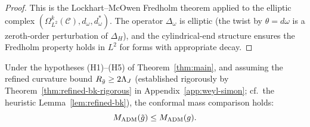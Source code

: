 \begin{proof}
This is the Lockhart--McOwen \cite{lockhartmccowen1985} Fredholm theorem applied to the elliptic complex $(\Omega^k_{L^2}(\mathcal{C}), d_{\omega}, d^*_{\omega})$. The operator $\Delta_{\omega}$ is elliptic (the twist by $\theta = d\omega$ is a zeroth-order perturbation of $\Delta_H$), and the cylindrical-end structure ensures the Fredholm property holds in $L^2$ for forms with appropriate decay.
\end{proof}

\begin{theorem}\label{thm:ccmc-main}
Under the hypotheses (H1)--(H5) of Theorem~\ref{thm:main}, and assuming the refined curvature bound $R_{\bar{g}} \geq 2\Lambda_J$ (established rigorously by Theorem~\ref{thm:refined-bk-rigorous} in Appendix~\ref{app:weyl-simon}; cf.\ the heuristic Lemma~\ref{lem:refined-bk}), the conformal mass comparison holds:
\begin{equation}\label{eq:ccmc-main}
M_{\mathrm{ADM}}(\tilde{g}) \leq M_{\mathrm{ADM}}(g).
\end{equation}
\end{theorem}

